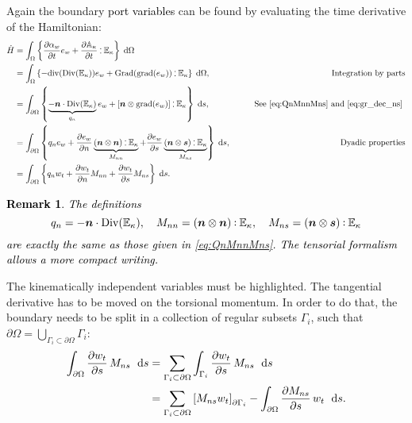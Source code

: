 \documentclass[11pt]{article}
\newtheorem{remark}{Remark}
\newcommand{\revOne}[1]{\textcolor{black}{#1}}
\def\onedot{$\mathsurround0pt\ldotp$}
\def\cddot{%
	\mathbin{\vcenter{\baselineskip.67ex
			\hbox{\onedot}\hbox{\onedot}}%
}}
\begin{document}
	Again the boundary \revOne{port variables} can be found by evaluating the time derivative of the Hamiltonian:
	\begin{equation}
	\begin{aligned}
	\dot{H}&= \int_{\Omega} \left\{ \diffp{\alpha_w}{t} e_w  + \diffp{\mathbb{A}_{\kappa}}{t} \cddot \mathbb{E}_{\kappa} \right\} \d\Omega \\
	&= \int_{\Omega} \left\{ - \mathrm{div}(\mathrm{Div}(\mathbb{E}_{\kappa})) e_w + \mathrm{Grad}(\mathrm{grad}(e_w)) \cddot \mathbb{E}_{\kappa} \right\} \d\Omega, &\qquad \text{Integration by parts} \\
	&=  \int_{\partial \Omega} \left\{ \underbrace{  - \bm{n} \cdot \mathrm{Div}(\mathbb{E}_{\kappa}) }_{q_n} e_w + \left[\bm{n} \otimes \mathrm{grad}(e_w) \right]\cddot \mathbb{E}_{\kappa} \right\} \d{s}, &\qquad \text{See \eqref{eq:QnMnnMns} and \eqref{eq:gr_dec_ns} }  \\
	&=\int_{\partial \Omega} \left\{ q_n e_w + \diffp{e_w}{n} \underbrace{\left(\bm{n} \otimes \bm{n} \right) \cddot \mathbb{E}_{\kappa}}_{M_{nn}} + \diffp{e_w}{s}  \underbrace{\left(\bm{n} \otimes\bm{s} \right)\cddot \mathbb{E}_{\kappa}}_{M_{ns}}   \right\} \d{s}, &\qquad \text{Dyadic properties}\\
	&=\int_{\partial \Omega} \left\{ q_n w_t + \diffp{w_t}{n} M_{nn} + \diffp{w_t}{s}  M_{ns}   \right\} \d{s}. 
	\end{aligned}
	\end{equation}
	\revOne{
		\begin{remark}
			The definitions
			\[q_n=  - \bm{n} \cdot \mathrm{Div}(\mathbb{E}_{\kappa}), \quad M_{nn} = \left(\bm{n} \otimes \bm{n} \right) \cddot \mathbb{E}_{\kappa}, \quad M_{ns} = \left(\bm{n} \otimes \bm{s} \right) \cddot \mathbb{E}_{\kappa}\] 
			are exactly the same as those given in \eqref{eq:QnMnnMns}. The tensorial formalism allows a more compact writing.
		\end{remark}
	}
	The kinematically independent variables must be highlighted. The tangential derivative has to be moved on the torsional momentum. In order to do that, the boundary needs to be split in a collection of regular subsets $\Gamma_{i}$, such that $\partial \Omega = \bigcup_{\Gamma_{i} \subset \partial \Omega} \Gamma_{i}$:
	\begin{equation}
	\begin{aligned}
	\int_{\partial \Omega} \diffp{w_t}{s} \, M_{ns} \ \d{s} &= \sum_{\Gamma_{i} \subset \partial \Omega} \int_{\Gamma_{i}}  \diffp{w_t}{s} \, M_{ns} \ \d{s} \\
	&= \sum_{\Gamma_{i} \subset \partial \Omega} \left[ M_{ns} w_t\right]_{\partial \Gamma_i} - \int_{\partial \Omega} \diffp{M_{ns}}{s} \, w_t \ \d{s}.
	\end{aligned}
	\end{equation}
	
\end{document}

